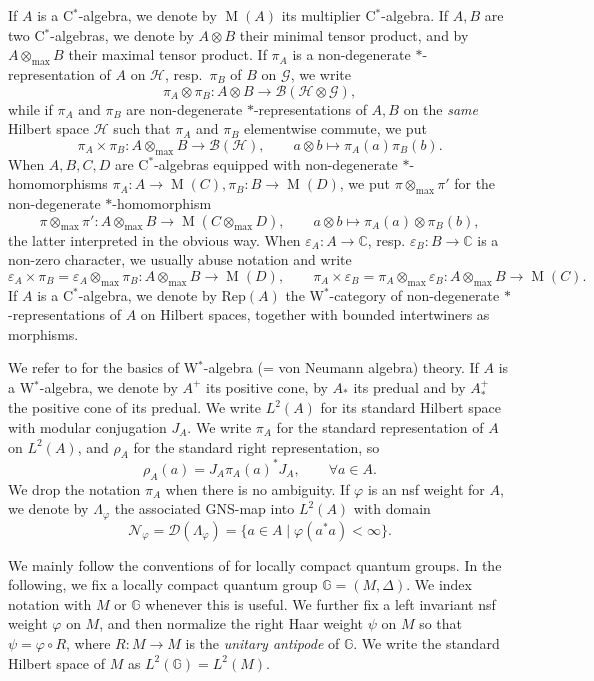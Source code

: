 \documentclass[reqno]{amsart}
\numberwithin{equation}{section}
\newcommand{\C}{\mathbb{C}}
\newcommand{\mcB}{\mathcal{B}}
\newcommand{\Hsp}{\mathcal{H}}
\newcommand{\Gsp}{\mathcal{G}}
\newcommand{\G}{\mathbb{G}}
\newcommand{\msD}{\mathscr{D}}
\newcommand{\msN}{\mathscr{N}}
\newcommand{\Rep}{\mathrm{Rep}}
\newcommand{\vp}{\varphi}
\newcommand{\Mult}{\operatorname{M}}
\begin{document}
If $A$ is a C$^*$-algebra, we denote by $\Mult(A)$ its multiplier C$^*$-algebra. If $A,B$ are two C$^*$-algebras, we denote by $A\otimes B$ their minimal tensor product, and by $A\otimes_{\max} B$ their maximal tensor product. If $\pi_A$ is a non-degenerate $*$-representation of $A$ on $\Hsp$, resp.\ $\pi_B$ of $B$ on $\Gsp$, we write 
\[
\pi_A\otimes \pi_B\colon A \otimes B \rightarrow\mcB(\Hsp \otimes \Gsp),
\]
while if $\pi_A$ and $\pi_B$ are non-degenerate $*$-representations of $A,B$ on the \emph{same} Hilbert space $\Hsp$ such that $\pi_A$ and $\pi_B$ elementwise commute, we put
\[
\pi_A\times \pi_B\colon A\otimes_{\max}B \rightarrow \mcB(\Hsp),\qquad a\otimes b \mapsto \pi_A(a)\pi_B(b). 
\]
When $A,B,C,D$ are C$^*$-algebras equipped with non-degenerate $*$-homomorphisms $\pi_A\colon A \rightarrow \Mult(C), \pi_B\colon B \rightarrow \Mult(D)$, we put $\pi\otimes_{\max} \pi'$ for the non-degenerate $*$-homomorphism 
\[
\pi\otimes_{\max} \pi'\colon A\otimes_{\max} B \rightarrow \Mult(C\otimes_{\max}D),\qquad a\otimes b \mapsto \pi_A(a)\otimes \pi_B(b),  
\]
the latter interpreted in the obvious way. When $\varepsilon_A\colon A \rightarrow \C$, resp. $\varepsilon_B\colon  B \rightarrow \C$ is a non-zero character, we usually abuse notation and write 
\[
\varepsilon_A \times \pi_B = \varepsilon_A \otimes_{\max} \pi_B\colon A\otimes_{\max}B \rightarrow \Mult(D),\qquad \pi_A \times \varepsilon_B = \pi_A \otimes_{\max} \varepsilon_B\colon A\otimes_{\max}B \rightarrow \Mult(C). 
\]
If $A$ is a C$^*$-algebra, we denote by $\Rep(A)$ the W$^*$-category of non-degenerate $*$-representations of $A$ on Hilbert spaces, together with bounded intertwiners as morphisms.


We refer to \cites{Tak02,Tak03,Haa75} for the basics of W$^*$-algebra (= von Neumann algebra) theory. If $A$ is a W$^*$-algebra, we denote by $A^+$ its positive cone, by $A_*$ its predual and by $A_*^+$ the positive cone of its predual. We write $L^2(A)$ for its standard Hilbert space with modular conjugation $J_A$. We write $\pi_A$ for the standard representation of $A$ on $L^2(A)$, and $\rho_A$ for the standard right representation, so 
\[
\rho_A(a) = J_A\pi_A(a)^*J_A,\qquad \forall a\in A. 
\]
We drop the notation $\pi_A$ when there is no ambiguity. If $\vp$ is an nsf weight for $A$, we denote by $\Lambda_{\vp}$ the associated GNS-map into $L^2(A)$ with domain
\[
\msN_{\vp} = \msD(\Lambda_{\vp}) = \{a\in A \mid \vp(a^*a)<\infty\}.
\]


We mainly follow the conventions of \cites{KV00,KV03} for locally compact quantum groups. In the following, we fix a locally compact quantum group $\G = (M,\Delta)$. We index notation with $M$ or $\G$ whenever this is useful. We further fix a left invariant nsf weight $\varphi$ on $M$, and then normalize the right Haar weight $\psi$ on $M$ so that $\psi = \vp \circ R$, where $R\colon M \rightarrow M$ is the \emph{unitary antipode} of $\G$. We write the standard Hilbert space of $M$ as $L^2(\G) = L^2(M)$. 
\end{document}
